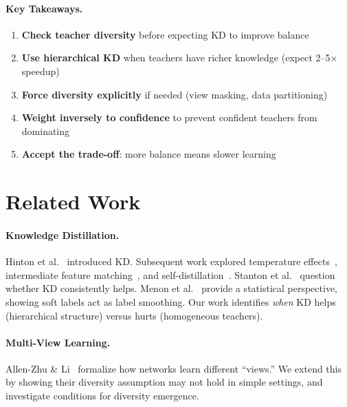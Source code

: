 \documentclass{article}
\begin{document}
\paragraph{Key Takeaways.}
\begin{enumerate}
    \item \textbf{Check teacher diversity} before expecting KD to improve balance
    \item \textbf{Use hierarchical KD} when teachers have richer knowledge (expect 2--5$\times$ speedup)
    \item \textbf{Force diversity explicitly} if needed (view masking, data partitioning)
    \item \textbf{Weight inversely to confidence} to prevent confident teachers from dominating
    \item \textbf{Accept the trade-off}: more balance means slower learning
\end{enumerate}

\section{Related Work}
\label{sec:related}

\paragraph{Knowledge Distillation.} Hinton et al.~\cite{hinton2015distilling} introduced KD. Subsequent work explored temperature effects~\cite{hinton2015distilling}, intermediate feature matching~\cite{romero2015fitnets}, and self-distillation~\cite{furlanello2018born}. Stanton et al.~\cite{stanton2021does} question whether KD consistently helps. Menon et al.~\cite{menon2021statistical} provide a statistical perspective, showing soft labels act as label smoothing. Our work identifies \textit{when} KD helps (hierarchical structure) versus hurts (homogeneous teachers).

\paragraph{Multi-View Learning.} Allen-Zhu \& Li~\cite{allen2023towards} formalize how networks learn different ``views.'' We extend this by showing their diversity assumption may not hold in simple settings, and investigate conditions for diversity emergence.
\end{document}
